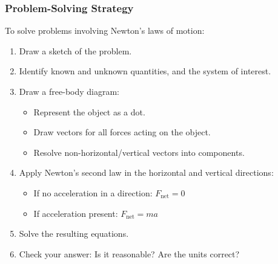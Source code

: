 \documentclass{beamer}
\begin{document}
\begin{frame}
\frametitle{Problem-Solving Strategy}
To solve problems involving Newton's laws of motion:
\begin{enumerate}
    \item Draw a sketch of the problem.
    \item Identify known and unknown quantities, and the system of interest.
    \item Draw a free-body diagram:
    \begin{itemize}
        \item Represent the object as a dot.
        \item Draw vectors for all forces acting on the object.
        \item Resolve non-horizontal/vertical vectors into components.
    \end{itemize}
    \item Apply Newton's second law in the horizontal and vertical directions:
    \begin{itemize}
        \item If no acceleration in a direction: $F_{\text{net}} = 0$
        \item If acceleration present: $F_{\text{net}} = ma$
    \end{itemize}
    \item Solve the resulting equations.
    \item Check your answer: Is it reasonable? Are the units correct?
\end{enumerate}
\end{frame}
\end{document}
